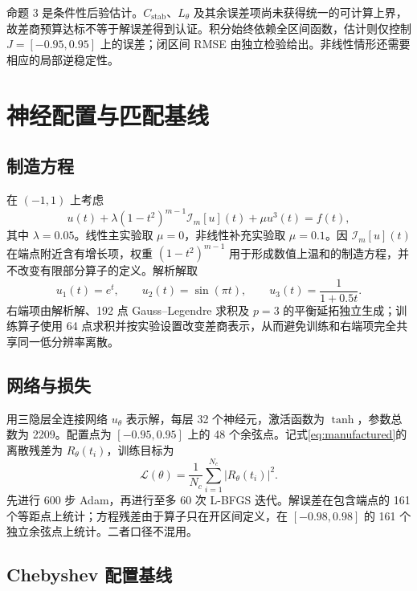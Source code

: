 \documentclass[UTF8,fontset=none,10.5pt,a4paper]{ctexart}
\numberwithin{equation}{section}
\begin{document}
命题 3 是条件性后验估计。$C_{\mathrm{stab}}$、$L_\theta$ 及其余误差项尚未获得统一的可计算上界，故差商预算达标不等于解误差得到认证。积分始终依赖全区间函数，估计则仅控制 $J=[-0.95,0.95]$ 上的误差；闭区间 RMSE 由独立检验给出。非线性情形还需要相应的局部逆稳定性。

\section{神经配置与匹配基线}

\subsection{制造方程}

在 $(-1,1)$ 上考虑
\begin{equation}
u(t)+\lambda(1-t^2)^{m-1}\mathcal I_m[u](t)+\mu u^3(t)=f(t),
\label{eq:manufactured}
\end{equation}
其中 $\lambda=0.05$。线性主实验取 $\mu=0$，非线性补充实验取 $\mu=0.1$。因 $\mathcal I_m[u](t)$ 在端点附近含有增长项，权重 $(1-t^2)^{m-1}$ 用于形成数值上温和的制造方程，并不改变有限部分算子的定义。解析解取
\begin{equation}
u_1(t)=e^t,\qquad
u_2(t)=\sin(\pi t),\qquad
u_3(t)=\frac{1}{1+0.5t}.
\label{eq:families}
\end{equation}
右端项由解析解、192 点 Gauss--Legendre 求积及 $p=3$ 的平衡延拓独立生成；训练算子使用 64 点求积并按实验设置改变差商表示，从而避免训练和右端项完全共享同一低分辨率离散。

\subsection{网络与损失}

用三隐层全连接网络 $u_\theta$ 表示解，每层 32 个神经元，激活函数为 $\tanh$，参数总数为 2209。配置点为 $[-0.95,0.95]$ 上的 48 个余弦点。记式\eqref{eq:manufactured}的离散残差为 $R_\theta(t_i)$，训练目标为
\begin{equation}
\mathcal L(\theta)=\frac1{N_c}\sum_{i=1}^{N_c}|R_\theta(t_i)|^2.
\label{eq:training-loss}
\end{equation}
先进行 600 步 Adam，再进行至多 60 次 L-BFGS 迭代。解误差在包含端点的 161 个等距点上统计；方程残差由于算子只在开区间定义，在 $[-0.98,0.98]$ 的 161 个独立余弦点上统计。二者口径不混用。

\subsection{Chebyshev 配置基线}
\end{document}
